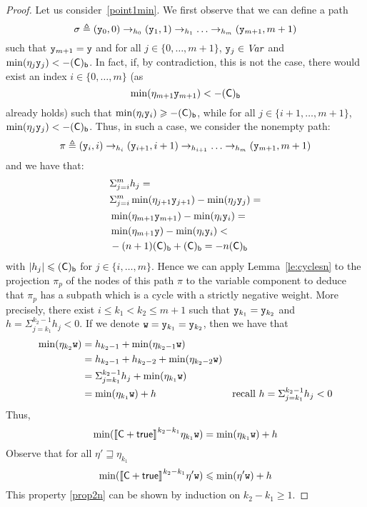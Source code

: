 \begin{proof}
  Let us consider\ \ref{point1min}. We first observe that we
  can define a path
  \begin{equation}
    \label{eq:fixn}
    \sigma \veq (\var[y]_0, 0) \to_{h_0} (\var[y]_1, 1) \to_{h_1}
    \ldots \to_{h_m} (\var[y]_{m+1}, m+1)
  \end{equation}
  such that \(\var[y]_{m+1}=\var[y]\) and for all \(j \in \{0,\ldots, m+1\}\), 
  \(\var[y]_j\in \Var\)  and
  \(\min(\eta_{j} \var[y]_{j}) < -\lbound{\com}\).
  In fact, if, by contradiction, this is not the case, there would
  exist an index \(i \in \{0,\ldots, m\}\) (as
  \[\min(\eta_{m+1} \var[y]_{m+1}) < -\lbound{\com}\] already holds)
  such that \(\min(\eta_{i} \var[y]_{i}) \geq -\lbound{\com}\), while
  for all \(j \in \{i+1,\ldots, m+1\}\),
  \(\min(\eta_{j} \var[y]_j) < -\lbound{\com}\).  Thus, in such a
  case, we consider the nonempty path:
  \[\pi \veq (\var[y]_i, i) \to_{h_i} (\var[y]_{i+1}, i+1) \to_{h_{i+1}} \ldots
  \to_{h_m} (\var[y]_{m+1}, m+1)\]
  and we have that:
  \begin{align*}
    &\Sigma_{j=i}^m h_j =\\ 
    &\Sigma_{j=i}^m \min(\eta_{j+1} \var[y]_{j+1}) - \min(\eta_j \var[y]_{j}) =\\
    &\min(\eta_{m+1} \var[y]_{m+1}) - \min(\eta_i \var[y]_{i}) =\\
    &\min(\eta_{m+1} \var[y]) - \min(\eta_i \var[y]_{i}) < \\
    &  - (n+1) \lbound{\com} + \lbound{\com} = - n \lbound{\com}
  \end{align*}
  with \(|h_j| \leq \lbound{\com}\) for \(j \in \{i,\ldots,
  m\}\). Hence we can apply Lemma~\ref{le:cyclesn} to the projection
  \(\pi_p\) of the nodes of this path \(\pi\) to the variable
  component to deduce that \(\pi_p\) has a subpath which is a cycle
  with a strictly negative weight.  More precisely, there exist
  \(i \leq k_1 < k_2 \leq m+1\) such that
  \(\var[y]_{k_1} = \var[y]_{k_2}\) and
  \(h = \Sigma_{j=k_1}^{k_2-1} h_j < 0\). If we denote
  \(\var[w] = \var[y]_{k_1} = \var[y]_{k_2}\), then we have that
  \begin{align*}
    \min(\eta_{k_2} \var[w]) & =  h_{k_2-1}  + \min(\eta_{k_2-1} \var[w]) \\
                             & =  h_{k_2-1} + h_{k_2-2} + \min(\eta_{k_2-2} \var[w])  \\
                             & = \Sigma_{j=k_1}^{k_2-1} h_j + \min(\eta_{k_1} \var[w])  \\
                             & = \min(\eta_{k_1} \var[w]) + h & \text{recall } h = \Sigma_{j=k_1}^{k_2-1} h_j < 0
  \end{align*}
  Thus,
  \[\min(\semi{\com \ndet \tru}^{k_2-k_1} \eta_{k_1} \var[w]) = \min(\eta_{k_1}
  \var[w]) + h\] 
  Observe that for all \(\eta' \sqsupseteq \eta_{k_1}\)
  \begin{equation}\label{prop2n}
    \min(\semi{\com \ndet \tru}^{k_2-k_1} \eta' \var[w]) \leq \min(\eta'
    \var[w]) + h
  \end{equation}
  This property \eqref{prop2n} can be shown by induction on \(k_2-k_1 \geq 1\).
  

\end{proof}
